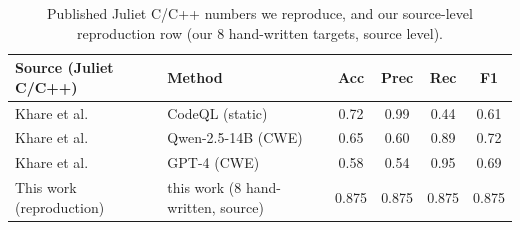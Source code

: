 \documentclass[10pt]{article}
\begin{document}
\begin{table}[h]
\centering
\small
\begin{tabular}{llcccc}
\toprule
Source (Juliet C/C++) & Method & Acc & Prec & Rec & F1 \\
\midrule
Khare et al.~\cite{khare2024} & CodeQL (static) & 0.72 & 0.99 & 0.44 & 0.61 \\
Khare et al.~\cite{khare2024} & Qwen-2.5-14B (CWE) & 0.65 & 0.60 & 0.89 & 0.72 \\
Khare et al.~\cite{khare2024} & GPT-4 (CWE) & 0.58 & 0.54 & 0.95 & 0.69 \\
\midrule
This work (reproduction) & this work (8 hand-written, source) & 0.875 & 0.875 & 0.875 & 0.875 \\
\bottomrule
\end{tabular}
\caption{Published Juliet C/C++ numbers we reproduce, and our source-level
reproduction row (our 8 hand-written targets, source level).}
\label{tab:baseline}
\end{table}
\end{document}
